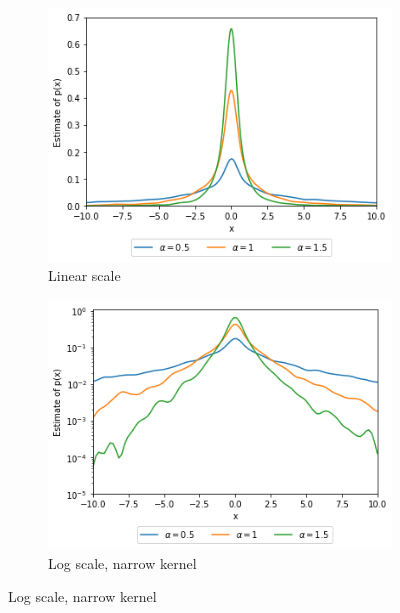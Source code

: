 \documentclass[a4paper]{article}
\begin{document}
\begin{figure}[h]
    \centering
    \begin{subfigure}[b]{0.3\textwidth}
        \centering
        \includegraphics[width=\textwidth]{figures/exponential_sampled_gaussian_kernel_smoothed.png}
        \caption{Linear scale}
        \label{fig:exponential_sampled_gaussian_kernel_smoothed_linear}
    \end{subfigure}
    \hfill
    \begin{subfigure}[b]{0.3\textwidth}
        \centering
        \includegraphics[width=\textwidth]{figures/exponential_sampled_gaussian_kernel_smoothed_log_narrow.png}
        \caption{Log scale, narrow kernel}
        \label{fig:exponential_sampled_gaussian_kernel_smoothed_log_narrow}
    \end{subfigure}

\end{figure}
\end{document}

